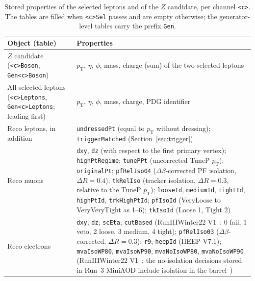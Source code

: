 \documentclass[11pt]{article}
\newcommand{\pt}{p_{\mathrm{T}}}
\newcommand{\code}[1]{\texttt{#1}}
\begin{document}
\begin{table}[htbp]
\centering
\caption{Stored properties of the selected leptons and of the $Z$ candidate, per channel \code{<c>}. The tables are filled
when \code{<c>Sel} passes and are empty otherwise; the generator-level tables carry the prefix \code{Gen}.}
\label{tab:leptoncols}
\small
\begin{tabularx}{\textwidth}{>{\raggedright\arraybackslash}p{3.3cm}>{\raggedright\arraybackslash}X}
\toprule
Object (table) & Properties \\
\midrule
$Z$ candidate (\code{<c>Boson}, \code{Gen<c>Boson}) & $\pt$, $\eta$, $\phi$, mass, charge (sum) of the two selected leptons \\
All selected leptons (\code{<c>Leptons}, \code{Gen<c>Leptons}; leading first) & $\pt$, $\eta$, $\phi$, mass, charge,
  PDG identifier \\
Reco leptons, in addition & \code{undressedPt} (equal to $\pt$ without dressing); \code{triggerMatched}
  (Section~\ref{sec:trigger}) \\
Reco muons~\cite{MUOrecommendations} & \code{dxy}, \code{dz} (with respect to the first primary vertex); \code{highPtRegime}; \code{tunePPt}
  (uncorrected TuneP $\pt$); \code{originalPt}; \code{pfRelIso04} ($\Delta\beta$-corrected PF isolation,
  $\Delta R = 0.4$); \code{tkRelIso} (tracker isolation, $\Delta R = 0.3$, relative to the TuneP $\pt$);
  \code{looseId}, \code{mediumId}, \code{tightId}, \code{highPtId}, \code{trkHighPtId}; \code{pfIsoId} (VeryLoose to
  VeryVeryTight as 1--6); \code{tkIsoId} (Loose 1, Tight 2) \\
Reco electrons & \code{dxy}, \code{dz}; \code{scEta}; \code{cutBased} (RunIIIWinter22 V1~\cite{EGMcutid}: 0 fail, 1 veto,
  2 loose, 3 medium, 4 tight); \code{pfRelIso03} ($\Delta\beta$-corrected, $\Delta R = 0.3$); \code{r9}; \code{heepId}
  (HEEP V7.1); \code{mvaIsoWP80},
  \code{mvaIsoWP90}, \code{mvaNoIsoWP80}, \code{mvaNoIsoWP90} (RunIIIWinter22 V1~\cite{EGMmvaid}; the no-isolation
  decisions stored in Run~3 MiniAOD include isolation in the barrel~\cite{EGMmvaid}) \\
\bottomrule
\end{tabularx}
\end{table}
\end{document}
